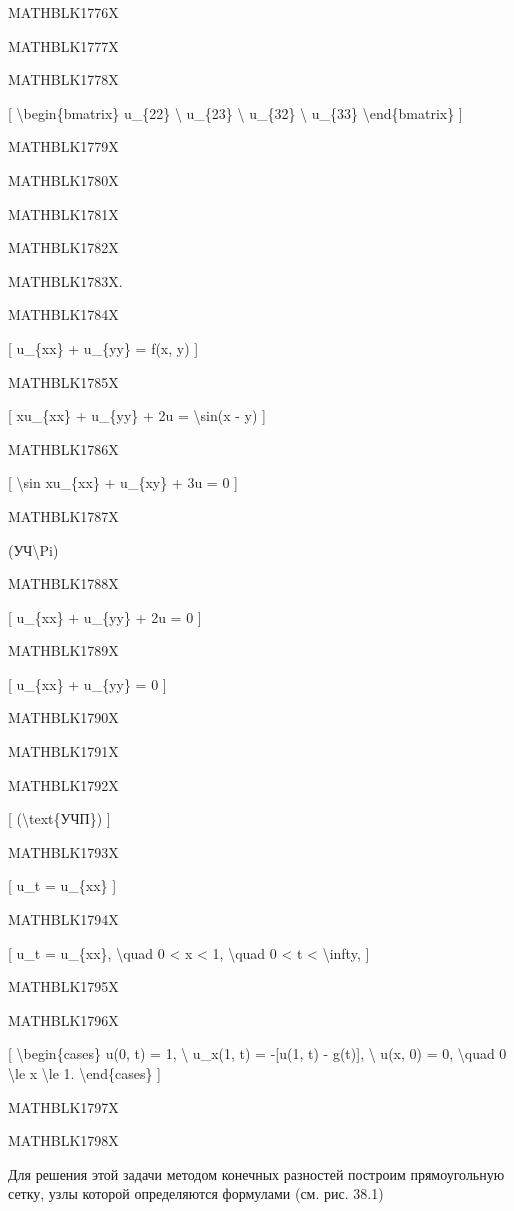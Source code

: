 \documentclass[
]{article}
\begin{document}
MATHBLK1776X

MATHBLK1777X

MATHBLK1778X

{[} \textbackslash begin\{bmatrix\} u\_\{22\} \textbackslash{} u\_\{23\}
\textbackslash{} u\_\{32\} \textbackslash{} u\_\{33\}
\textbackslash end\{bmatrix\} {]}

MATHBLK1779X

MATHBLK1780X

MATHBLK1781X

MATHBLK1782X

MATHBLK1783X.

MATHBLK1784X

{[} u\_\{xx\} + u\_\{yy\} = f(x, y) {]}

MATHBLK1785X

{[} xu\_\{xx\} + u\_\{yy\} + 2u = \textbackslash sin(x - y) {]}

MATHBLK1786X

{[} \textbackslash sin xu\_\{xx\} + u\_\{xy\} + 3u = 0 {]}

MATHBLK1787X

(УЧ\textbackslash Pi)

MATHBLK1788X

{[} u\_\{xx\} + u\_\{yy\} + 2u = 0 {]}

MATHBLK1789X

{[} u\_\{xx\} + u\_\{yy\} = 0 {]}

MATHBLK1790X

MATHBLK1791X

MATHBLK1792X

{[} (\textbackslash text\{УЧП\}) {]}

MATHBLK1793X

{[} u\_t = u\_\{xx\} {]}

MATHBLK1794X

{[} u\_t = u\_\{xx\}, \textbackslash quad 0 \textless{} x \textless{} 1,
\textbackslash quad 0 \textless{} t \textless{} \textbackslash infty,
{]}

MATHBLK1795X

MATHBLK1796X

{[} \textbackslash begin\{cases\} u(0, t) = 1, \textbackslash{} u\_x(1,
t) = -{[}u(1, t) - g(t){]}, \textbackslash{} u(x, 0) = 0,
\textbackslash quad 0 \textbackslash le x \textbackslash le 1.
\textbackslash end\{cases\} {]}

MATHBLK1797X

MATHBLK1798X

Для решения этой задачи методом конечных разностей построим
прямоугольную сетку, узлы которой определяются формулами (см. рис. 38.1)
\end{document}
